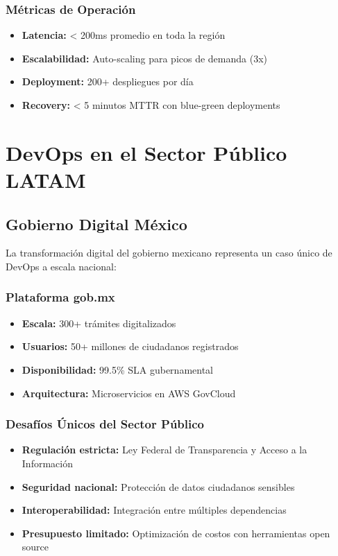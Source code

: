 \documentclass[12pt,a4paper]{article}
\begin{document}
\subsubsection{Métricas de Operación}
\begin{itemize}
    \item \textbf{Latencia:} < 200ms promedio en toda la región
    \item \textbf{Escalabilidad:} Auto-scaling para picos de demanda (3x)
    \item \textbf{Deployment:} 200+ despliegues por día
    \item \textbf{Recovery:} < 5 minutos MTTR con blue-green deployments
\end{itemize}

\section{DevOps en el Sector Público LATAM}

\subsection{Gobierno Digital México}
La transformación digital del gobierno mexicano representa un caso único de DevOps a escala nacional:

\subsubsection{Plataforma gob.mx}
\begin{itemize}
    \item \textbf{Escala:} 300+ trámites digitalizados
    \item \textbf{Usuarios:} 50+ millones de ciudadanos registrados
    \item \textbf{Disponibilidad:} 99.5\% SLA gubernamental
    \item \textbf{Arquitectura:} Microservicios en AWS GovCloud
\end{itemize}

\subsubsection{Desafíos Únicos del Sector Público}
\begin{itemize}
    \item \textbf{Regulación estricta:} Ley Federal de Transparencia y Acceso a la Información
    \item \textbf{Seguridad nacional:} Protección de datos ciudadanos sensibles
    \item \textbf{Interoperabilidad:} Integración entre múltiples dependencias
    \item \textbf{Presupuesto limitado:} Optimización de costos con herramientas open source
\end{itemize}
\end{document}
